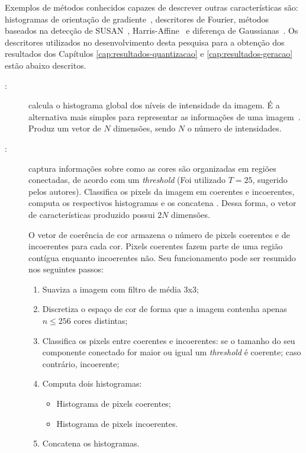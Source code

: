 Exemplos de métodos conhecidos capazes de descrever outras características são: histogramas de orientação de gradiente~\cite{Wang2009}, descritores de Fourier, métodos baseados na detecção de SUSAN~\cite{Smith1997}, Harris-Affine~\cite{Han2005b} e diferença de Gaussianas~\cite{Lowe2004a}. Os descritores utilizados no desenvolvimento desta pesquisa para a obtenção dos resultados dos Capítulos \ref{cap:resultados-quantizacao} e \ref{cap:resultados-geracao} estão abaixo descritos.

\begin{description}
\item[:] calcula o histograma global dos níveis de intensidade da imagem. É a alternativa mais simples para representar as informações de uma imagem~\cite{Gonzalez2007}. Produz um vetor de $N$ dimensões, sendo $N$ o número de intensidades.

\item[:] captura informações sobre como as cores são organizadas em regiões conectadas, de acordo com um \textit{threshold} (Foi utilizado $T = 25$, sugerido pelos autores). Classifica os pixels da imagem em coerentes e incoerentes, computa os respectivos histogramas e os concatena \cite{ccv}. Dessa forma, o vetor de características produzido possui $2N$ dimensões.

O vetor de coerência de cor armazena o número de pixels coerentes e de incoerentes para cada cor. Pixels coerentes fazem parte de uma região contígua enquanto incoerentes não. Seu funcionamento pode ser resumido nos seguintes passos:

\begin{enumerate}
  \item Suaviza a imagem com filtro de média 3x3;
  \item Discretiza o espaço de cor de forma que a imagem contenha apenas $n \leq 256$ cores distintas;
  \item Classifica os pixels entre coerentes e incoerentes: se o tamanho do seu componente conectado for maior ou igual um \textit{threshold} é coerente; caso contrário, incoerente;
  \item Computa dois histogramas:
  \begin{itemize}
    \item Histograma de pixels coerentes;
    \item Histograma de pixels incoerentes.
  \end{itemize}
  \item Concatena os histogramas.
\end{enumerate}


\end{description}
